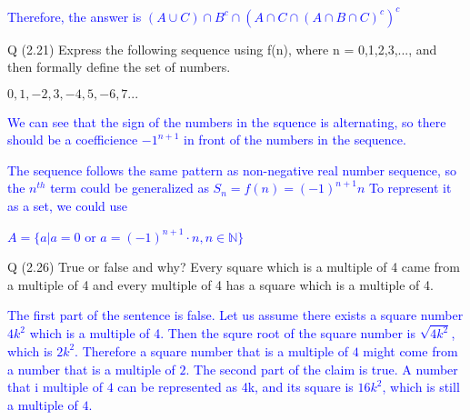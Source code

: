 \documentclass{article}
\begin{document}
	\textcolor{blue}{
	Therefore, the answer is $(A \cup C) \cap B^c \cap (A \cap C \cap (A \cap B \cap C)^c)^c$}

\clearpage

\begin{addmargin}[2em]{2em}
	\indent Q (2.21) Express the following sequence using f(n), where n = 0,1,2,3,..., and then formally define the set of numbers.
	\begin{center}
		$0,1,-2,3,-4,5,-6,7...$
	\end{center}
	\textcolor{blue}{
		\indent We can see that the sign of the numbers in the squence is alternating, so there should be a coefficience $-1^{n+1}$ in front of the numbers in the sequence.}
	
	\textcolor{blue}{
		 The sequence follows the same pattern as non-negative real number sequence, so the $n^{th}$ term could be generalized as $S_n = f(n) = (-1)^{n+1}n$
	To represent it as a set, we could use}
	\begin{center}
		\textcolor{blue}{
			$A = \{a| a = 0$ or $a = (-1)^{n+1} \cdot n, n \in \mathbb{N}\}$}
	\end{center}
\end{addmargin}

\clearpage
\begin{addmargin}[2em]{0em}
	\indent Q (2.26) True or false and why? Every square which is a multiple of 4 came from a multiple of 4 and every multiple of 4 has a square which is a multiple of 4.
	
	\textcolor{blue}{The first part of the sentence is false. Let us assume there exists a square number $4k^2$ which is a multiple of 4. Then the squre root of the square number is $\sqrt{4k^2}$, which is $2k^2$. Therefore a square number that is a multiple of $4$ might come from a number that is a multiple of $2$. The second part of the claim is true. A number that i multiple of $4$ can be represented as 4k, and its square is $16k^2$, which is still a multiple of $4$.}
\end{addmargin}
\end{document}
